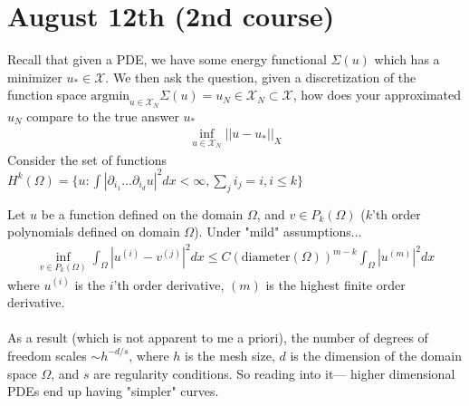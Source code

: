 \section{August 12th (2nd course)}
Recall that given a PDE, we have some energy functional $\Sigma(u)$ which has a minimizer $u_* \in \mathcal X$. We then ask the question, given a discretization of the function space $\text{argmin}_{u \in \mathcal X_N} \Sigma(u) = u_N \in \mathcal X_N \subset \mathcal X$, how does your approximated $u_N$ compare to the true answer $u_*$
\begin{align}
	\inf_{u \in \mathcal X_N}||u-u_*||_X
\end{align}
Consider the set of functions $H^k(\Omega) = \{u : \int |\partial_{i_1} ... \partial_{i_d} u|^2 d x < \infty, \sum_j i_j = i, i \leq k\}$

\begin{theorem}
	 Let $u$ be a function defined on the domain $\Omega$, and $v \in P_k(\Omega)$ ($k$'th order polynomials defined on domain $\Omega$). Under "mild" assumptions...
	\begin{align}
		\inf_{v \in P_k(\Omega)} \int_\Omega |u^{(i)} - v^{(j)}|^2 dx \leq C (\text{diameter}(\Omega))^{m-k} \int_\Omega |u^{(m)}|^2 dx
	\end{align}
	where $u^{(i)}$ is the $i$'th order derivative, $(m)$ is the highest finite order derivative.\\
	\\
	As a result (which is not apparent to me a priori), the number of degrees of freedom scales $\sim h^{-d/s}$, where $h$ is the mesh size, $d$ is the dimension of the domain space $\Omega$, and $s$ are regularity conditions. So reading into it--- higher dimensional PDEs end up having "simpler" curves.
\end{theorem}














































